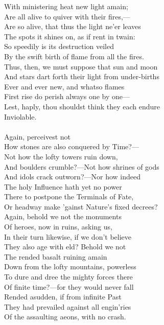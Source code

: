 With ministering heat new light amain;\\
Are all alive to quiver with their fires,—\\
Are so alive, that thus the light ne'er leaves\\
The spots it shines on, as if rent in twain:\\
So speedily is its destruction veiled\\
By the swift birth of flame from all the fires.\\
Thus, then, we must suppose that sun and moon\\
And stars dart forth their light from under-births\\
Ever and ever new, and whatso flames\\
First rise do perish always one by one—\\
Lest, haply, thou shouldst think they each endure\\
Inviolable.\\
\\
Again, perceivest not\\
How stones are also conquered by Time?—\\
Not how the lofty towers ruin down,\\
And boulders crumble?—Not how shrines of gods\\
And idols crack outworn?—Nor how indeed\\
The holy Influence hath yet no power\\
There to postpone the Terminals of Fate,\\
Or headway make 'gainst Nature's fixed decrees?\\
Again, behold we not the monuments\\
Of heroes, now in ruins, asking us,\\
In their turn likewise, if we don't believe\\
They also age with eld? Behold we not\\
The rended basalt ruining amain\\
Down from the lofty mountains, powerless\\
To dure and dree the mighty forces there\\
Of finite time?—for they would never fall\\
Rended asudden, if from infinite Past\\
They had prevailed against all engin'ries\\
Of the assaulting aeons, with no crash.\\
\\
